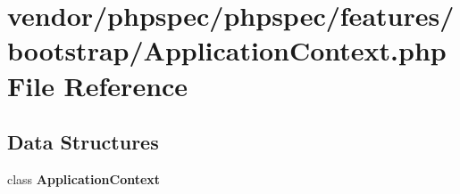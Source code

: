 \section{vendor/phpspec/phpspec/features/bootstrap/\+Application\+Context.php File Reference}
\label{_application_context_8php}
\subsection*{Data Structures}
\begin{DoxyCompactItemize}
\item 
class {\bf Application\+Context}
\end{DoxyCompactItemize}
